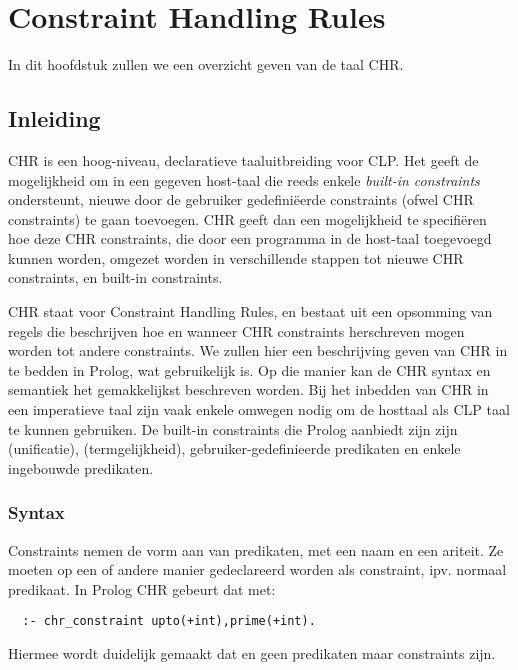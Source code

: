 \chapter{Constraint Handling Rules}

In dit hoofdstuk zullen we een overzicht geven van de taal CHR.

\section{Inleiding}

CHR is een hoog-niveau, declaratieve taaluitbreiding voor CLP. Het geeft de mogelijkheid om in een gegeven host-taal die reeds enkele {\em built-in constraints} ondersteunt, nieuwe door de gebruiker gedefini\"eerde constraints (ofwel CHR constraints) te gaan toevoegen. CHR geeft dan een mogelijkheid te specifi\"eren hoe deze CHR constraints, die door een programma in de host-taal toegevoegd kunnen worden, omgezet worden in verschillende stappen tot nieuwe CHR constraints, en built-in constraints.

CHR staat voor Constraint Handling Rules, en bestaat uit een opsomming van regels die beschrijven hoe en wanneer CHR constraints herschreven mogen worden tot andere constraints. We zullen hier een beschrijving geven van CHR in te bedden in Prolog, wat gebruikelijk is. Op die manier kan de CHR syntax en semantiek het gemakkelijkst beschreven worden. Bij het inbedden van CHR in een imperatieve taal zijn vaak enkele omwegen nodig om de hosttaal als CLP taal te kunnen gebruiken. De built-in constraints die Prolog aanbiedt zijn zijn \code{=} (unificatie), \code{==} (termgelijkheid), gebruiker-gedefinieerde predikaten en enkele ingebouwde predikaten.

\subsection{Syntax}

Constraints nemen de vorm aan van predikaten, met een naam en een ariteit. Ze moeten op een of andere manier gedeclareerd worden als constraint, ipv. normaal predikaat. In Prolog CHR gebeurt dat met: \begin{Verbatim}
  :- chr_constraint upto(+int),prime(+int).
\end{Verbatim}
Hiermee wordt duidelijk gemaakt dat  en  geen predikaten maar constraints zijn.

